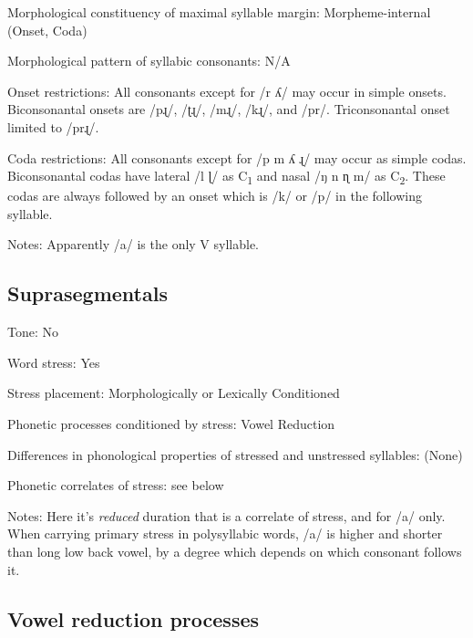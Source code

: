 {\begin{appendixdesc}
\item[Morphological constituency of maximal syllable margin:] Morpheme-internal (Onset, Coda)

\item[Morphological pattern of syllabic consonants:] N/A

\item[Onset restrictions:] All consonants except for /r ʎ/ may occur in simple onsets. Biconsonantal onsets are /pɻ/, /ʈɻ/, /mɻ/, /kɻ/, and /pr/. Triconsonantal onset limited to /prɻ/.

\item[Coda restrictions:] All consonants except for /p m ʎ ɻ/ may occur as simple codas. Biconsonantal codas have lateral /l ɭ/ as C\textsubscript{1} and nasal /ŋ n ɳ m/ as C\textsubscript{2}. These codas are always followed by an onset which is /k/ or /p/ in the following syllable.

\item[Notes:] Apparently /a/ is the only V syllable.
\end{appendixdesc}
\subsection*{Suprasegmentals}
\begin{appendixdesc}
\item[Tone:] No

\item[Word stress:] Yes

\item[Stress placement:] Morphologically or Lexically Conditioned

\item[Phonetic processes conditioned by stress:] Vowel Reduction

\item[Differences in phonological properties of stressed and unstressed syllables:] (None)

\item[Phonetic correlates of stress:] see below

\item[Notes:] Here it’s \textit{reduced} duration that is a correlate of stress, and for /a/ only. When carrying primary stress in polysyllabic words, /a/ is higher and shorter than long low back vowel, by a degree which depends on which consonant follows it.
\end{appendixdesc}
\subsection*{Vowel reduction processes}
\begin{appendixdesc}


\end{appendixdesc}}
